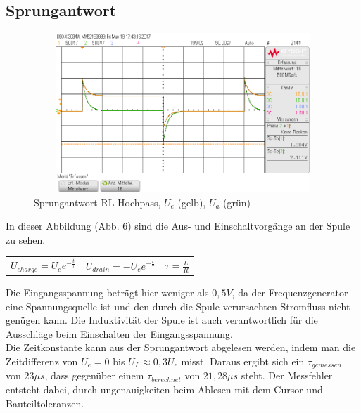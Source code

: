 \subsection{Sprungantwort}
\begin{figure}[H]
 \begin{center}
  \includegraphics[height=6cm,width=12cm]{Oszi_Bilder/RL_Sprung}
 \end{center}
 \caption{Sprungantwort RL-Hochpass, $U_e$ (gelb), $U_a$ (gr\"un)}
\end{figure}
\noindent
In dieser Abbildung (Abb. 6) sind die Aus- und Einschaltvorgänge an der Spule zu sehen.
\begin{longtable}{p{}p{}p{}}
\centering
$U_{charge} = U_e e^{-\frac{t}{\tau}}$ & $U_{drain} = -U_e e^{-\frac{t}{\tau}}$ & $\tau = \frac{L}{R}$
\end{longtable}
\noindent
Die Eingangsspannung beträgt hier weniger als $0,5V$, da der Frequenzgenerator eine Spannungsquelle ist und den durch die Spule verursachten Stromfluss
nicht genügen kann. Die Induktivität der Spule ist auch verantwortlich für die Ausschläge beim Einschalten der Eingangsspannung. \\
Die Zeitkonstante kann aus der Sprungantwort abgelesen werden, indem man die Zeitdifferenz von $U_e=0$ bis $U_L \approx 0,3U_e$ misst. Daraus ergibt
sich ein $\tau_{gemessen}$ von $23\mu s$, dass gegenüber einem $\tau_{berechnet}$ von $21,28\mu s$ steht. Der Messfehler entsteht dabei, durch ungenauigkeiten
beim Ablesen mit dem Cursor und Bauteiltoleranzen.

